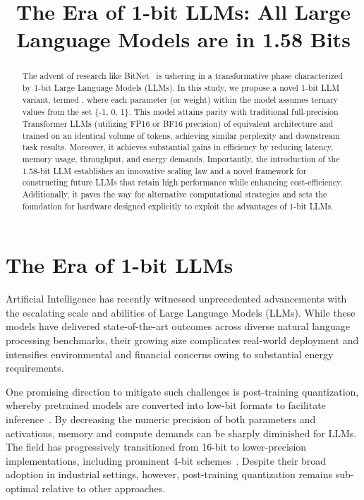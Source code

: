 \title{The Era of 1-bit LLMs: All Large Language Models are in 1.58 Bits}

\begin{abstract}
The advent of research like BitNet~\cite{bitnet} is ushering in a transformative phase characterized by 1-bit Large Language Models (LLMs). In this study, we propose a novel 1-bit LLM variant, termed \textbf{}, where each parameter (or weight) within the model assumes ternary values from the set \{-1, 0, 1\}. This model attains parity with traditional full-precision Transformer LLMs (utilizing FP16 or BF16 precision) of equivalent architecture and trained on an identical volume of tokens, achieving similar perplexity and downstream task results. Moreover, it achieves substantial gains in efficiency by reducing latency, memory usage, throughput, and energy demands. Importantly, the introduction of the 1.58-bit LLM establishes an innovative scaling law and a novel framework for constructing future LLMs that retain high performance while enhancing cost-efficiency. Additionally, it paves the way for alternative computational strategies and sets the foundation for hardware designed explicitly to exploit the advantages of 1-bit LLMs.
\end{abstract}

\section{The Era of 1-bit LLMs}

Artificial Intelligence has recently witnessed unprecedented advancements with the escalating scale and abilities of Large Language Models (LLMs). While these models have delivered state-of-the-art outcomes across diverse natural language processing benchmarks, their growing size complicates real-world deployment and intensifies environmental and financial concerns owing to substantial energy requirements.

One promising direction to mitigate such challenges is post-training quantization, whereby pretrained models are converted into low-bit formats to facilitate inference~\cite{smoothquant, gptq, quip, quip_sharp}. By decreasing the numeric precision of both parameters and activations, memory and compute demands can be sharply diminished for LLMs. The field has progressively transitioned from 16-bit to lower-precision implementations, including prominent 4-bit schemes~\cite{gptq, awq}. Despite their broad adoption in industrial settings, however, post-training quantization remains sub-optimal relative to other approaches.


